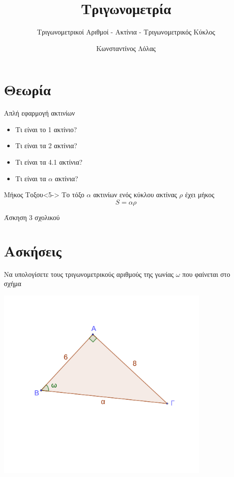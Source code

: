 \documentclass{../presentation}
\title{Τριγωνομετρία}
\subtitle{Τριγωνομετρικοί Αριθμοί - Ακτίνια - Τριγωνομετρικός Κύκλος}
\author[Λόλας]{Κωνσταντίνος Λόλας}
\date{}
\begin{document}
\begin{frame}
  \titlepage
\end{frame}

\section{Θεωρία}
\begin{frame}{Απλή εφαρμογή ακτινίων}
  \begin{itemize}
    \item<1-> Τι είναι το 1 ακτίνιο?
    \item<2-> Τι είναι τα 2 ακτίνια?
    \item<3-> Τι είναι τα 4.1 ακτίνια?
    \item<4-> Τι είναι τα $α$ ακτίνια?
  \end{itemize}
  \begin{block}{Μήκος Τοξου}<5->
    Το τόξο $α$ ακτινίων ενός κύκλου ακτίνας $ρ$ έχει μήκος
    $$S=αρ$$
  \end{block}
   Άσκηση 3 σχολικού
\end{frame}

\section{Ασκήσεις}

\begin{askisi}
  Να υπολογίσετε τους τριγωνομετρικούς αριθμούς της γωνίας $ω$ που φαίνεται στο σχήμα

  \centering
  \includegraphics[width=0.8\textwidth]{"./images/3.1.1_1.png"}
\end{askisi}
\end{document}
